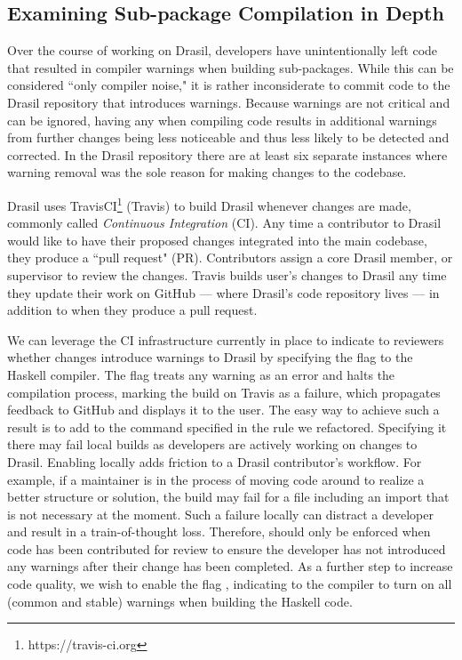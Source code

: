 {{\subsection{Examining Sub-package Compilation in Depth}\label{bsRefactorCI}

Over the course of working on Drasil, developers have unintentionally left code that resulted in compiler warnings when building sub-packages. While this can be considered ``only compiler noise," it is rather inconsiderate to commit code to the Drasil repository that introduces warnings. Because warnings are not critical and can be ignored, having any when compiling code results in additional warnings from further changes being less noticeable and thus less likely to be detected and corrected. In the Drasil repository there are at least six separate instances where warning removal was the sole reason for making changes to the codebase. 

Drasil uses TravisCI\footnote{https://travis-ci.org} (Travis) to build Drasil whenever changes are made, commonly called \textit{Continuous Integration} (CI). Any time a contributor to Drasil would like to have their proposed changes integrated into the main codebase, they produce a ``pull request" (PR). Contributors assign a core Drasil member, or supervisor to review the changes. Travis builds user's changes to Drasil any time they update their work on GitHub --- where Drasil's code repository lives --- in addition to when they produce a pull request. 

We can leverage the CI infrastructure currently in place to indicate to reviewers whether changes introduce warnings to Drasil by specifying the \linebreak{} flag to the Haskell compiler. The  flag treats any warning as an error and halts the compilation process, marking the build on Travis as a failure, which propagates feedback to GitHub and displays it to the user. The easy way to achieve such a result is to add  to the  command specified in the rule we refactored. Specifying it there may fail local builds as developers are actively working on changes to Drasil. Enabling  locally adds friction to a Drasil contributor's workflow. For example, if a maintainer is in the process of moving code around to realize a better structure or solution, the build may fail for a file including an import that is not necessary at the moment. Such a failure locally can distract a developer and result in a train-of-thought loss. Therefore,  should only be enforced when code has been contributed for review to ensure the developer has not introduced any warnings after their change has been completed. As a further step to increase code quality, we wish to enable the flag , indicating to the compiler to turn on all (common and stable) warnings when building the Haskell code. 

}}
